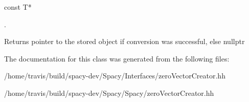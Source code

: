 \begin{DoxyCode}
 const T* 
\end{DoxyCode}
. \begin{DoxyReturn}{\-Returns}
pointer to the stored object if conversion was successful, else nullptr 
\end{DoxyReturn}


\-The documentation for this class was generated from the following files\-:\begin{DoxyCompactItemize}
\item 
/home/travis/build/spacy-\/dev/\-Spacy/\-Interfaces/zero\-Vector\-Creator.\-hh\item 
/home/travis/build/spacy-\/dev/\-Spacy/\-Spacy/zero\-Vector\-Creator.\-hh\end{DoxyCompactItemize}
